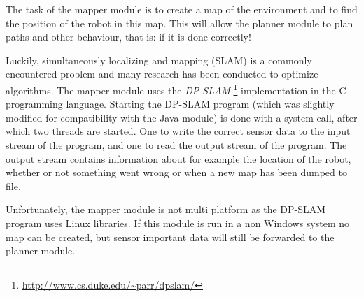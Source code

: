 The task of the mapper module is to create a map of the environment and to find the position of
the robot in this map. This will allow the planner module to plan paths and other behaviour, that is:
if it is done correctly! 

Luckily, simultaneously localizing and mapping (SLAM) 
is a commonly encountered problem and 
many research has been conducted to optimize algorithms. The mapper module uses the \emph{DP-SLAM}
\footnote{\url{http://www.cs.duke.edu/~parr/dpslam/}} implementation in the C programming language.
Starting the DP-SLAM program (which was slightly modified for compatibility with the Java module)
is done with a system call, after which two threads are started. One to write the correct sensor 
data to the input stream of the program, and one to read the output stream of the program. The 
output stream contains information about for example the location of the robot, whether or not
something went wrong or when a new map has been dumped to file.

Unfortunately, the mapper module is not multi platform as the DP-SLAM program uses Linux libraries. 
If this module is run in a non Windows system no map can be created, but sensor important data will
still be forwarded to the planner module. 


